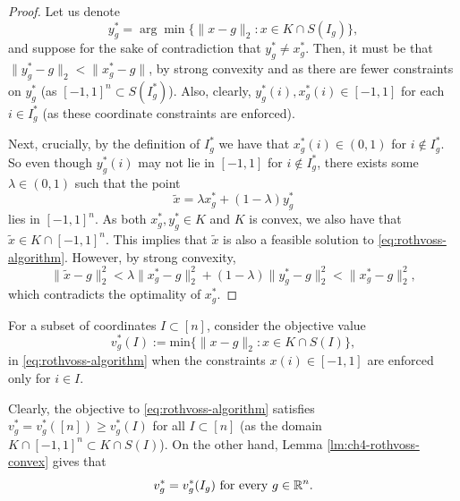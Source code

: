 \begin{proof}
Let us denote \[y_g^*=\arg\min\{ \|x-g\|_2: x \in K \cap S(I_g)\},\] and
suppose for the sake of contradiction that $y_g^*\neq x_g^*$.
Then, it must be that  $\|y_g^*-g\|_2 < \|x_g^*-g\|$, by strong convexity and as there are fewer constraints on $y_g^*$ (as $[-1,1]^n \subset  S(I_g^*)$).
Also, clearly, 
$y_g^*(i),x_g^*(i)  \in [-1,1]$ for each $i\in I_g^*$ (as these coordinate constraints are enforced). 

Next, crucially, by the definition of $I_g^*$ we have that $x_g^*(i) \in (0,1)$ for $i\notin I_g^*$.
So even though $y_g^*(i)$ may not lie in $[-1,1]$ for $i \notin I_g^*$, there exists some $\lambda \in (0,1)$ such that the point \[\tilde{x} = \lambda x_g^* + (1-\lambda) y_g^*\] lies in $[-1,1]^n$. As both $x_g^*,y_g^* \in K$ and $K$ is convex, we also have that $\tilde{x} \in K \cap [-1,1]^n$. This implies that $\tilde{x}$ is also a feasible solution to \eqref{eq:rothvoss-algorithm}. However, by strong convexity, \[\|\tilde{x}-g\|^2_2 < \lambda \|x_g^*-g\|_2^2 + (1-\lambda) \|y_g^*-g\|_2^2 <  \|x_g^*-g\|^2_2,\] which contradicts the optimality of $x_g^*$.
\end{proof}

For a subset of coordinates $I \subset [n]$, consider the objective value  
\[  v_g^*(I) := \text{min}\{ \|x-g\|_2: x \in K \cap S(I)\},\]
 in \eqref{eq:rothvoss-algorithm} when the constraints $x(i) \in [-1,1]$ are enforced only for $i\in I$. 
 
Clearly, the objective to \eqref{eq:rothvoss-algorithm} satisfies  $v^*_g =  v^*_g([n])\geq v^*_g(I)$ for all $I \subset [n]$ (as the domain $K \cap [-1,1]^n \subset K\cap S(I) $). 
On the other hand, 
Lemma \ref{lm:ch4-rothvoss-convex} gives that  \begin{equation}
    \label{eq:ch-rothvoss-val-relation}
    v^*_g = v^*_g(I_g) \text{ for every $g \in \mathbb{R}^n$}.
\end{equation}


